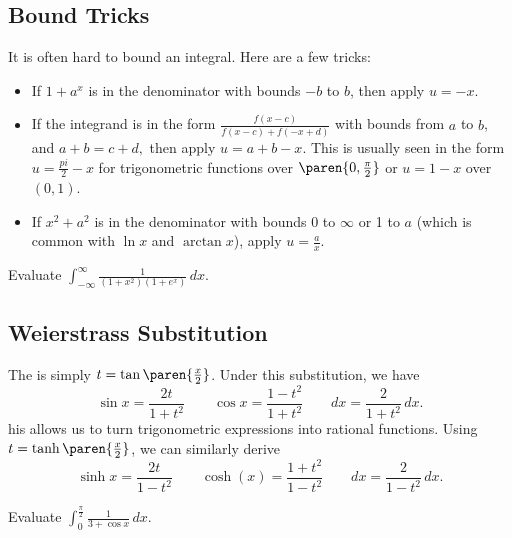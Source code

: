 \documentclass[blue,onecol]{shooting}
\begin{document}

\subsection{Bound Tricks}
It is often hard to bound an integral. Here are a few tricks:
\begin{itemize}
    \item If $1+a^x$ is in the denominator with bounds $-b$ to $b$, then apply $u=-x$.
    \item If the integrand is in the form $\frac{f(x-c)}{f(x-c)+f(-x+d)}$ with bounds from $a$ to $b$, and $a+b=c+d,$ then apply $u=a+b-x$. This is usually seen in the form $u=\frac{pi}{2}-x$ for trigonometric functions over $\paren{0,\frac{\pi}{2}}$ or $u=1-x$ over $(0,1)$.
    \item If $x^2+a^2$ is in the denominator with bounds 0 to $\infty$ or 1 to $a$ (which is common with $\ln x$ and $\arctan x$), apply $u=\frac{a}{x}$.
\end{itemize}

\begin{exer}
Evaluate $\int_{-\infty}^{\infty} \frac{1}{(1+x^2)(1+e^x)}\,dx$.
\end{exer}

\subsection{Weierstrass Substitution}
The  is simply $t=\tan\paren{\frac{x}{2}}$. Under this substitution, we have
$$\sin x=\frac{2t}{1+t^2} \qquad \cos x=\frac{1-t^2}{1+t^2} \qquad dx=\frac{2}{1+t^2}\,dx.$$
his allows us to turn trigonometric expressions into rational functions. Using $t=\tanh\paren{\frac{x}{2}}$, we can similarly derive
$$\sinh x=\frac{2t}{1-t^2} \qquad \cosh(x)=\frac{1+t^2}{1-t^2} \qquad dx=\frac{2}{1-t^2}\,dx.$$

\begin{exer}
Evaluate $\int_0^{\frac{\pi}{2}} \frac{1}{3+\cos x}\,dx$.
\end{exer}
\end{document}

